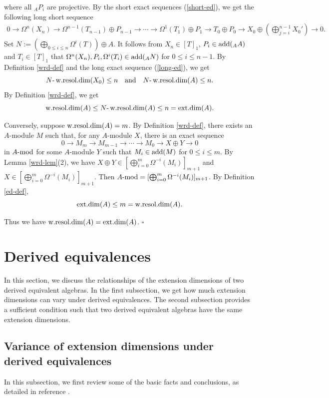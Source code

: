 \documentclass[12pt]{article}
\numberwithin{equation}{section}
\theoremstyle{definition}
\newcommand{\add}{{\rm add}}
\def\ed{\mathop{\rm ext.dim}\nolimits}
\def\wrd{\mathop{\rm w.resol.dim}\nolimits}
\newcommand{\modcat}{\ensuremath{\mbox{{\rm -mod}}}}
\newcommand{\lra}{\longrightarrow}
\begin{document}
where all $_AP_i$ are projective. By the short exact sequences (\ref{short-ed}), we get the following long short sequence
\begin{align}\label{long-ed}
0\lra \Omega^n(X_n)\lra \Omega^{n-1}(T_{n-1})\oplus P_{n-1}\lra\cdots \lra \Omega^1(T_1)\oplus P_1\lra T_0\oplus P_0\lra X_0\oplus (\bigoplus_{j=i}^{n-1} X_0')\lra 0.
\end{align}
Set $N:=(\bigoplus_{0\le i\le n}\Omega^i(T))\oplus A$. It follows from $X_n\in [T]_1$, $P_i\in \add(_AA)$ and $T_i\in[T]_1$ that $\Omega^n(X_n),P_i,\Omega^{i}(T_{i})\in \add(_AN)$ for $0\le i\le n-1$. By Definition \ref{wrd-def} and the long exact sequence (\ref{long-ed}), we get
$$N\mbox{-}\wrd(X_0)\le n
\quad\mbox{and}\quad N\mbox{-}\wrd(A)\le n.$$
By Definition \ref{wrd-def}, we get $$\wrd(A)\le N\mbox{-}\wrd(A)\le n=\ed(A).$$

Conversely, suppose $\wrd(A)=m$. By Definition \ref{wrd-def}, there exists an $A$-module $M$ such that, for any $A$-module $X$, there is an exact sequence
$$0\lra M_{m}\lra M_{m-1}\lra \cdots\lra M_0\lra X\oplus Y\lra 0$$
in $A\modcat$ for some $A$-module $Y$ such that $M_i\in \add(M)$ for $0\le i\le m$. By Lemma \ref{wrd-lem}(2), we have $X\oplus Y\in [\bigoplus_{i=0}^m\Omega^{-i}(M_i)]_{m+1}$ and $X\in [\bigoplus_{i=0}^m\Omega^{-i}(M_i)]_{m+1}$. Then $A\modcat= [\bigoplus_{i=0}^m\Omega^{-i}(M_i)]_{m+1}$. By Definition \ref{ed-def}, $$\ed(A)\le m=\wrd(A).$$

Thus we have $\wrd(A)=\ed(A)$.
$\square$

\section{Derived equivalences}
In this section, we discuss the relationships of the extension dimensions of two derived equivalent algebras. In the first subsection, we get how much extension dimensions can vary under derived equivalences. The second subsection provides a sufficient condition such that two derived equivalent algebras have the same extension dimensions.

\subsection{Variance of extension dimensions under derived equivalences}\label{der-var}
In this subsection, we first review some of the basic facts and conclusions, as detailed in reference \cite{hp17}.
\end{document}
